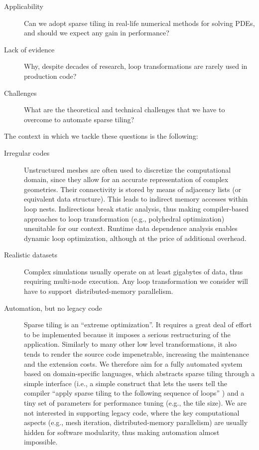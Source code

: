 \begin{description}
\item[Applicability] Can we adopt sparse tiling in real-life numerical methods for solving PDEs, and should we expect any gain in performance?
\item[Lack of evidence] Why, despite decades of research, loop transformations are rarely used in production code? 
\item[Challenges] What are the theoretical and technical challenges that we have to overcome to automate sparse tiling?
\end{description}

The context in which we tackle these questions is the following:
\begin{description}
\item[Irregular codes] Unstructured meshes are often used to discretize the computational domain, since they allow for an accurate representation of complex geometries. Their connectivity is stored by means of adjacency lists (or equivalent data structure). This leads to indirect memory accesses within loop nests. Indirections break static analysis, thus making compiler-based approaches to loop transformation (e.g., polyhedral optimization) unsuitable for our context. Runtime data dependence analysis enables dynamic loop optimization, although at the price of additional overhead.
\item[Realistic datasets] Complex simulations usually operate on at least gigabytes of data, thus requiring multi-node execution. Any loop transformation we consider will have to support\ distributed-memory parallelism.
\item[Automation, but no legacy code] Sparse tiling is an ``extreme optimization''. It requires a great deal of effort to be implemented because it imposes a serious restructuring of the application. Similarly to many other low level transformations, it also tends to render the source code impenetrable, increasing the maintenance and the extension costs. We therefore aim for a fully automated system based on domain-specific languages, which abstracts sparse tiling through a simple interface (i.e., a simple construct that lets the users tell the compiler ``apply sparse tiling to the following sequence of loops'' ) and a tiny set of parameters for performance tuning (e.g., the tile size). We are not interested in supporting legacy code, where the key computational aspects (e.g., mesh iteration, distributed-memory parallelism) are usually hidden for software modularity, thus making automation almost impossible.
\end{description}

